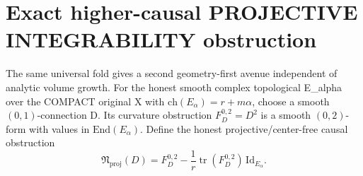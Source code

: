 \documentclass[11pt]{article}
\begin{document}
\section{Exact higher-causal PROJECTIVE INTEGRABILITY obstruction}

The same universal fold gives a second
geometry-first avenue independent of
analytic volume growth. For the honest
smooth complex topological E_alpha over
the COMPACT original X with
$\mathrm{ch}(E_\alpha)=r+m\alpha$,
choose a smooth $(0,1)$-connection D.
Its curvature obstruction
$F_D^{0,2}=D^2$ is a smooth
$(0,2)$-form with values in
$\mathrm{End}(E_\alpha)$.
Define the honest projective/center-free
causal obstruction
\[
 \boxed{
 \mathfrak N_{\mathrm{proj}}(D)=
 F_D^{0,2}
 -\frac1r\operatorname{tr}(F_D^{0,2})\,\mathrm{Id}_{E_\alpha}.
 }                                                        \tag{9.1}
\]
\end{document}
